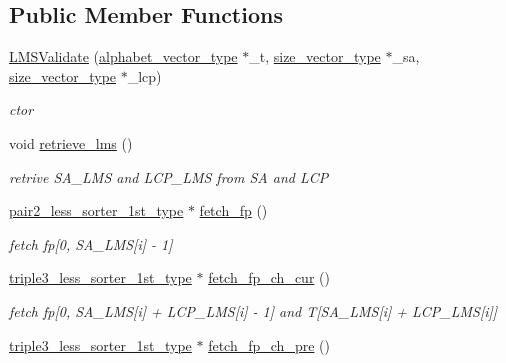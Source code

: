 \subsection*{Public Member Functions}
\begin{DoxyCompactItemize}
\item 
\hyperlink{struct_validate4_1_1_l_m_s_validate_a93810bf60dc23710fb678ae863aaebec}{L\+M\+S\+Validate} (\hyperlink{class_validate4_a49c80b3d101be19542a4341c2387603a}{alphabet\+\_\+vector\+\_\+type} $\ast$\+\_\+t, \hyperlink{class_validate4_a46ea31a0a4b23f583806792160421d15}{size\+\_\+vector\+\_\+type} $\ast$\+\_\+sa, \hyperlink{class_validate4_a46ea31a0a4b23f583806792160421d15}{size\+\_\+vector\+\_\+type} $\ast$\+\_\+lcp)
\begin{DoxyCompactList}\small\item\em ctor \end{DoxyCompactList}\item 
void \hyperlink{struct_validate4_1_1_l_m_s_validate_afd7ee2100849c6c9bc493782d0c9aea3}{retrieve\+\_\+lms} ()
\begin{DoxyCompactList}\small\item\em retrive S\+A\+\_\+\+L\+MS and L\+C\+P\+\_\+\+L\+MS from SA and L\+CP \end{DoxyCompactList}\item 
\hyperlink{class_validate4_ad945003027abfd152a0e177d7541580d}{pair2\+\_\+less\+\_\+sorter\+\_\+1st\+\_\+type} $\ast$ \hyperlink{struct_validate4_1_1_l_m_s_validate_a0d6e08ffc57dfd088ff737ed01a566b2}{fetch\+\_\+fp} ()
\begin{DoxyCompactList}\small\item\em fetch fp\mbox{[}0, S\+A\+\_\+\+L\+MS\mbox{[}i\mbox{]} -\/ 1\mbox{]} \end{DoxyCompactList}\item 
\hyperlink{class_validate4_ac2e4bde5df51eeff18ef5591d76e63dc}{triple3\+\_\+less\+\_\+sorter\+\_\+1st\+\_\+type} $\ast$ \hyperlink{struct_validate4_1_1_l_m_s_validate_aa0d10da14dc1a8015967216e19eeb9af}{fetch\+\_\+fp\+\_\+ch\+\_\+cur} ()
\begin{DoxyCompactList}\small\item\em fetch fp\mbox{[}0, S\+A\+\_\+\+L\+MS\mbox{[}i\mbox{]} + L\+C\+P\+\_\+\+L\+MS\mbox{[}i\mbox{]} -\/ 1\mbox{]} and T\mbox{[}S\+A\+\_\+\+L\+MS\mbox{[}i\mbox{]} + L\+C\+P\+\_\+\+L\+MS\mbox{[}i\mbox{]}\mbox{]} \end{DoxyCompactList}\item 
\hyperlink{class_validate4_ac2e4bde5df51eeff18ef5591d76e63dc}{triple3\+\_\+less\+\_\+sorter\+\_\+1st\+\_\+type} $\ast$ \hyperlink{struct_validate4_1_1_l_m_s_validate_a4e998a01460cb1c68954282065ec7c86}{fetch\+\_\+fp\+\_\+ch\+\_\+pre} ()

\end{DoxyCompactItemize}
